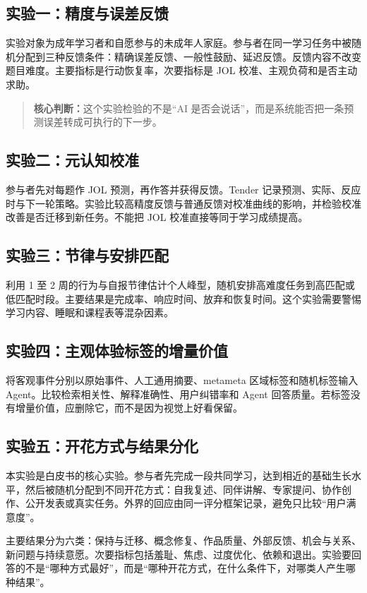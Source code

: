 \documentclass[UTF8,a4paper,11pt]{ctexart}
\newcommand{\keypoint}[1]{\begin{quote}\noindent\textbf{\color{TenderBlue}核心判断：}#1\end{quote}}
\begin{document}
\subsection{实验一：精度与误差反馈}

实验对象为成年学习者和自愿参与的未成年人家庭。参与者在同一学习任务中被随机分配到三种反馈条件：精确误差反馈、一般性鼓励、延迟反馈。反馈内容不改变题目难度。主要指标是行动恢复率，次要指标是 JOL 校准、主观负荷和是否主动求助。

\keypoint{这个实验检验的不是“AI 是否会说话”，而是系统能否把一条预测误差转成可执行的下一步。}

\subsection{实验二：元认知校准}

参与者先对每题作 JOL 预测，再作答并获得反馈。Tender 记录预测、实际、反应时与下一轮策略。实验比较高精度反馈与普通反馈对校准曲线的影响，并检验校准改善是否迁移到新任务。不能把 JOL 校准直接等同于学习成绩提高。

\subsection{实验三：节律与安排匹配}

利用 1 至 2 周的行为与自报节律估计个人峰型，随机安排高难度任务到高匹配或低匹配时段。主要结果是完成率、响应时间、放弃和恢复时间。这个实验需要警惕学习内容、睡眠和课程表等混杂因素。

\subsection{实验四：主观体验标签的增量价值}

将客观事件分别以原始事件、人工通用摘要、metameta 区域标签和随机标签输入 Agent。比较检索相关性、解释准确性、用户纠错率和 Agent 回答质量。若标签没有增量价值，应删除它，而不是因为视觉上好看保留。

\subsection{实验五：开花方式与结果分化}

本实验是白皮书的核心实验。参与者先完成一段共同学习，达到相近的基础生长水平，然后被随机分配到不同开花方式：自我复述、同伴讲解、专家提问、协作创作、公开发表或真实任务。外界的回应由同一评分框架记录，避免只比较“用户满意度”。

主要结果分为六类：保持与迁移、概念修复、作品质量、外部反馈、机会与关系、新问题与持续意愿。次要指标包括羞耻、焦虑、过度优化、依赖和退出。实验要回答的不是“哪种方式最好”，而是“哪种开花方式，在什么条件下，对哪类人产生哪种结果”。
\end{document}
